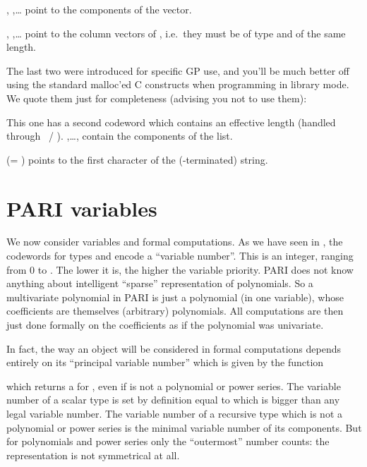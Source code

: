 %
, ,\dots {} point to the components of
the vector.

, ,\dots {} point to the column vectors
of , i.e.~they must be of type  and of the same length.

\noindent The last two were introduced for specific GP use, and you'll be
much better off using the standard malloc'ed C constructs when programming
in library mode. We quote them just for completeness (advising you not to
use them):

This one has a second codeword which contains an effective length (handled
through ~/ ). ,\dots, 
contain the components of the list.

%
 (= ) points to the first character of the
(-terminated) string.

\section{PARI variables}\label{se:vars}

\noindent
We now consider variables and formal computations. As we have seen in
, the codewords for types  and 
encode a ``variable number''. This is an integer, ranging from $0$ to
. The lower it is, the higher the variable priority. PARI does
not know anything about intelligent ``sparse'' representation of polynomials.
So a multivariate polynomial in PARI is just a polynomial (in one variable),
whose coefficients are themselves (arbitrary) polynomials. All computations
are then just done formally on the coefficients as if the polynomial was
univariate.

In fact, the way an object will be considered in formal computations depends
entirely on its ``principal variable number'' which is given by the function


\noindent which returns a  for , even if 
is not a polynomial or power series. The variable number of a scalar type is
set by definition equal to  which is bigger than any legal
variable number. The variable number of a recursive type which is not a
polynomial or power series is the minimal variable number of its components.
But for polynomials and power series only the ``outermost'' number counts:
the representation is not symmetrical at all.

